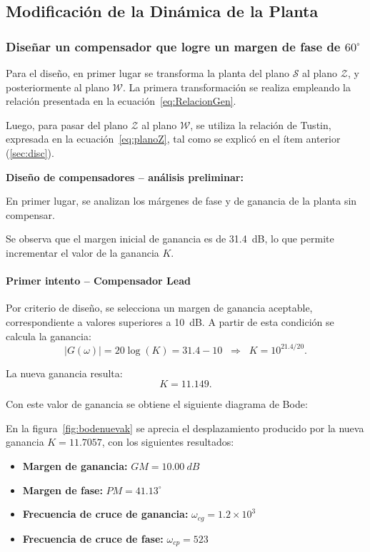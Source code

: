 \subsection{Modificación de la Dinámica de la Planta}
\subsubsection{Diseñar un compensador que logre un margen de fase de $60^\circ$} 

Para el diseño, en primer lugar se transforma la planta del plano $\mathcal{S}$ al plano $\mathcal{Z}$, y posteriormente al plano $\mathcal{W}$. La primera transformación se realiza empleando la relación presentada en la ecuación~\ref{eq:RelacionGen}.  

Luego, para pasar del plano $\mathcal{Z}$ al plano $\mathcal{W}$, se utiliza la relación de Tustin, expresada en la ecuación~\ref{eq:planoZ}, tal como se explicó en el ítem anterior (\ref{sec:disc}).

\textbf{Diseño de compensadores – análisis preliminar:}  

En primer lugar, se analizan los márgenes de fase y de ganancia de la planta sin compensar.


Se observa que el margen inicial de ganancia es de \SI{31.4}{dB}, lo que permite incrementar el valor de la ganancia $K$.  

\paragraph{Primer intento – Compensador Lead}  

Por criterio de diseño, se selecciona un margen de ganancia aceptable, correspondiente a valores superiores a \SI{10}{dB}. A partir de esta condición se calcula la ganancia:
\[
|G(\omega)| = 20 \log(K) = 31.4 - 10 
\;\;\Rightarrow\;\; K = 10^{21.4/20}.
\]

La nueva ganancia resulta:
\[
K = 11.149.
\]

Con este valor de ganancia se obtiene el siguiente diagrama de Bode:


En la figura~\ref{fig:bodenuevak} se aprecia el desplazamiento producido por la nueva ganancia $K = 11.7057$, con los siguientes resultados:
\begin{itemize}
	\item \textbf{Margen de ganancia:} $GM = \SI{10.00}{dB}$
	\item \textbf{Margen de fase:} $PM = 41.13^\circ$
	\item \textbf{Frecuencia de cruce de ganancia:} $\omega_{cg} = 1.2 \times 10^3$
	\item \textbf{Frecuencia de cruce de fase:} $\omega_{cp} = 523$
\end{itemize}


